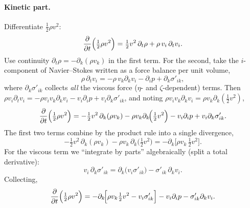 \documentclass[../main.tex]{subfiles}
\begin{document}
\paragraph{Kinetic part.} Differentiate $\tfrac12\rho v^2$:
\begin{equation}
  \pdv{}{t}\Big(\tfrac12\rho v^2\Big)=\tfrac12 v^2\,\partial_t\rho + \rho\,v_i\,\partial_t v_i .
  \label{eq:lec19_kin1}
\end{equation}
Use continuity $\partial_t\rho=-\partial_k(\rho v_k)$ in the first term. For the second, take the $i$-component of Navier--Stokes written as a force balance per unit volume,
\begin{equation}
  \rho\,\partial_t v_i = -\rho\,v_k\partial_k v_i - \partial_i p + \partial_k\sigma'_{ik},
  \label{eq:lec19_NS_index}
\end{equation}
where $\partial_k\sigma'_{ik}$ collects \emph{all} the viscous force ($\eta$- and $\zeta$-dependent) terms. Then $\rho v_i\partial_t v_i = -\rho v_i v_k\partial_k v_i - v_i\partial_i p + v_i\partial_k\sigma'_{ik}$, and noting $\rho v_i v_k\partial_k v_i=\rho v_k\partial_k(\tfrac12 v^2)$,
\begin{equation}
  \pdv{}{t}\Big(\tfrac12\rho v^2\Big)
    = -\tfrac12 v^2\,\partial_k(\rho v_k) - \rho v_k\partial_k\!\Big(\tfrac12 v^2\Big)
      - v_i\partial_i p + v_i\partial_k\sigma'_{ik}.
  \label{eq:lec19_kin2}
\end{equation}
The first two terms combine by the product rule into a single divergence,
\begin{equation}
  -\tfrac12 v^2\,\partial_k(\rho v_k) - \rho v_k\,\partial_k\!\Big(\tfrac12 v^2\Big)
    = -\partial_k\!\Big[\rho v_k\,\tfrac12 v^2\Big].
  \label{eq:lec19_kin_div}
\end{equation}
For the viscous term we ``integrate by parts'' algebraically (split a total derivative):
\begin{equation}
  v_i\,\partial_k\sigma'_{ik} = \partial_k\big(v_i\sigma'_{ik}\big) - \sigma'_{ik}\,\partial_k v_i .
  \label{eq:lec19_visc_split}
\end{equation}
Collecting,
\begin{equation}
  \pdv{}{t}\Big(\tfrac12\rho v^2\Big)
    = -\partial_k\!\Big[\rho v_k\tfrac12 v^2 - v_i\sigma'_{ik}\Big]
      - v_i\partial_i p - \sigma'_{ik}\partial_k v_i .
  \label{eq:lec19_kin_final}
\end{equation}
\end{document}
